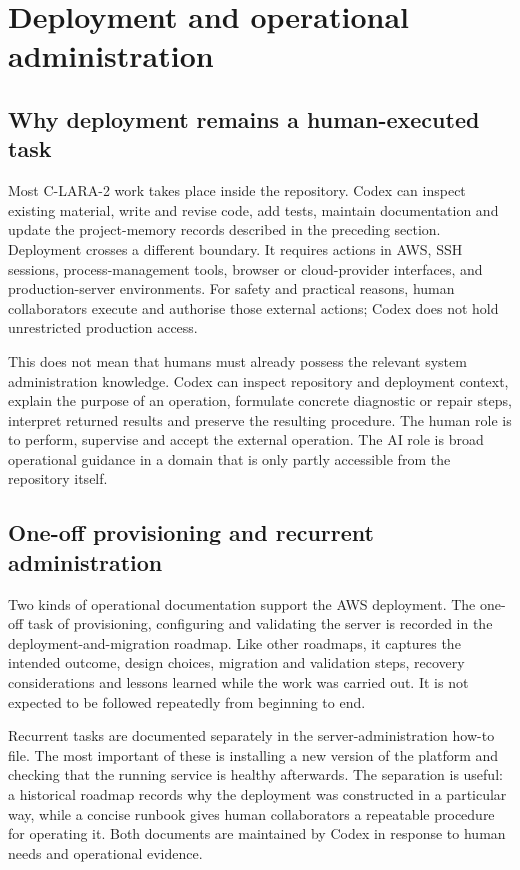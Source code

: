 \section{Deployment and operational administration}

\subsection{Why deployment remains a human-executed task}

Most C-LARA-2 work takes place inside the repository. Codex can inspect
existing material, write and revise code, add tests, maintain documentation
and update the project-memory records described in the preceding section.
Deployment crosses a different boundary. It requires actions in AWS, SSH
sessions, process-management tools, browser or cloud-provider interfaces, and
production-server environments. For safety and practical reasons, human
collaborators execute and authorise those external actions; Codex does not hold
unrestricted production access.

This does not mean that humans must already possess the relevant system
administration knowledge. Codex can inspect repository and deployment context,
explain the purpose of an operation, formulate concrete diagnostic or repair
steps, interpret returned results and preserve the resulting procedure. The
human role is to perform, supervise and accept the external operation. The AI
role is broad operational guidance in a domain that is only partly accessible
from the repository itself.

\subsection{One-off provisioning and recurrent administration}

Two kinds of operational documentation support the AWS deployment. The
one-off task of provisioning, configuring and validating the server is
recorded in the deployment-and-migration roadmap. Like other roadmaps, it
captures the intended outcome, design choices, migration and validation steps,
recovery considerations and lessons learned while the work was carried out.
It is not expected to be followed repeatedly from beginning to end.

Recurrent tasks are documented separately in the server-administration
how-to file. The most important of these is installing a new version of the
platform and checking that the running service is healthy afterwards. The
separation is useful: a historical roadmap records why the deployment was
constructed in a particular way, while a concise runbook gives human
collaborators a repeatable procedure for operating it. Both documents are
maintained by Codex in response to human needs and operational evidence.

